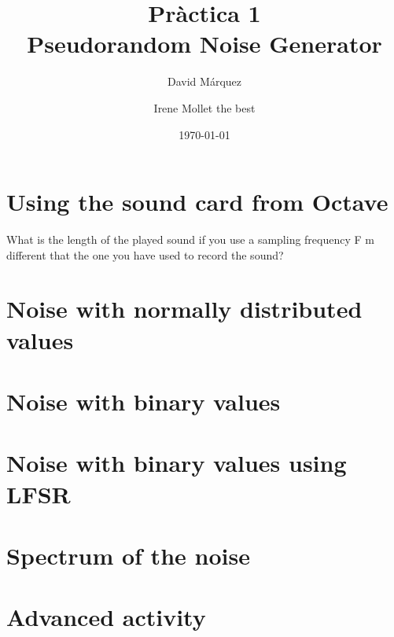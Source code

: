 \documentclass[11pt]{report}
\author{David Márquez\and Irene Mollet the best}
\date{\today}
\title{Pràctica 1\\Pseudorandom Noise Generator}
\begin{document}
\maketitle

\section*{Using the sound card from Octave}
What is the length of the played sound if you use a sampling frequency F m different that the
one you have used to record the sound?
\section*{Noise with normally distributed values}

\section*{Noise with binary values}

\section*{Noise with binary values using LFSR}

\section*{Spectrum of the noise}

\section*{Advanced activity}
\end{document}
